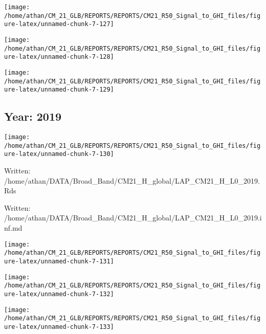 \documentclass[
  11pt,
  a4paper,oneside]{article}
\begin{document}
\begin{center}\texttt{[image: /home/athan/CM\_21\_GLB/REPORTS/REPORTS/CM21\_R50\_Signal\_to\_GHI\_files/figure-latex/unnamed-chunk-7-127]} \end{center}

\begin{center}\texttt{[image: /home/athan/CM\_21\_GLB/REPORTS/REPORTS/CM21\_R50\_Signal\_to\_GHI\_files/figure-latex/unnamed-chunk-7-128]} \end{center}

\begin{center}\texttt{[image: /home/athan/CM\_21\_GLB/REPORTS/REPORTS/CM21\_R50\_Signal\_to\_GHI\_files/figure-latex/unnamed-chunk-7-129]} \end{center}

\FloatBarrier

\newpage

\hypertarget{year-2019}{%
\subsection{Year: 2019}\label{year-2019}}

\begin{center}\texttt{[image: /home/athan/CM\_21\_GLB/REPORTS/REPORTS/CM21\_R50\_Signal\_to\_GHI\_files/figure-latex/unnamed-chunk-7-130]} \end{center}

Written: /home/athan/DATA/Broad\_Band/CM21\_H\_global/LAP\_CM21\_H\_L0\_2019.Rds

Written: /home/athan/DATA/Broad\_Band/CM21\_H\_global/LAP\_CM21\_H\_L0\_2019.inf.md

\begin{center}\texttt{[image: /home/athan/CM\_21\_GLB/REPORTS/REPORTS/CM21\_R50\_Signal\_to\_GHI\_files/figure-latex/unnamed-chunk-7-131]} \end{center}

\begin{center}\texttt{[image: /home/athan/CM\_21\_GLB/REPORTS/REPORTS/CM21\_R50\_Signal\_to\_GHI\_files/figure-latex/unnamed-chunk-7-132]} \end{center}

\begin{center}\texttt{[image: /home/athan/CM\_21\_GLB/REPORTS/REPORTS/CM21\_R50\_Signal\_to\_GHI\_files/figure-latex/unnamed-chunk-7-133]} \end{center}
\end{document}
